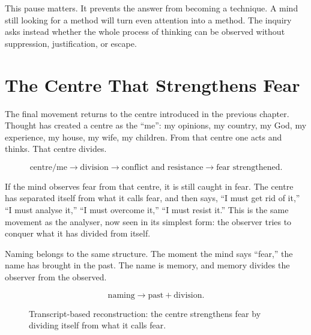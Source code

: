 \documentclass[11pt,oneside]{book}
\begin{document}
This pause matters. It prevents the answer from becoming a technique. A mind still looking for a method will turn even attention into a method. The inquiry asks instead whether the whole process of thinking can be observed without suppression, justification, or escape.

\section{The Centre That Strengthens Fear}

The final movement returns to the centre introduced in the previous chapter. Thought has created a centre as the ``me'': my opinions, my country, my God, my experience, my house, my wife, my children. From that centre one acts and thinks. That centre divides.

\begin{equation}
\text{centre/me}
\longrightarrow
\text{division}
\longrightarrow
\text{conflict and resistance}
\longrightarrow
\text{fear strengthened}.
\end{equation}

If the mind observes fear from that centre, it is still caught in fear. The centre has separated itself from what it calls fear, and then says, ``I must get rid of it,'' ``I must analyse it,'' ``I must overcome it,'' ``I must resist it.'' This is the same movement as the analyser, now seen in its simplest form: the observer tries to conquer what it has divided from itself.

Naming belongs to the same structure. The moment the mind says ``fear,'' the name has brought in the past. The name is memory, and memory divides the observer from the observed.

\begin{equation}
\text{naming}
\longrightarrow
\text{past}+\text{division}.
\end{equation}

\begin{figure}
\centering
{}

Transcript-based reconstruction: the centre strengthens fear by dividing itself from what it calls fear.
\end{figure}
\end{document}
